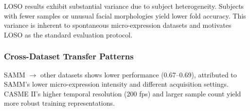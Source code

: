 LOSO results exhibit substantial variance due to subject heterogeneity. Subjects with fewer samples or unusual facial morphologies yield lower fold accuracy. This variance is inherent to spontaneous micro-expression datasets and motivates LOSO as the standard evaluation protocol.

\subsubsection{Cross-Dataset Transfer Patterns}

SAMM $\rightarrow$ other datasets shows lower performance (0.67--0.69), attributed to SAMM's lower micro-expression intensity and different acquisition settings. CASME II's higher temporal resolution (200 fps) and larger sample count yield more robust training representations.
